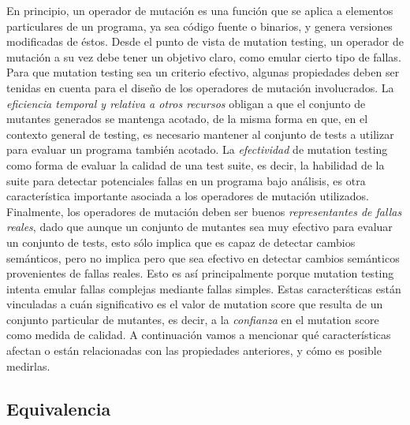 En principio, un operador de mutaci\'on es una funci\'on que se aplica a elementos particulares de un programa, ya sea c\'odigo fuente o binarios, y genera versiones modificadas de \'estos. Desde el punto de vista de mutation testing, un operador de mutaci\'on a su vez debe tener un objetivo claro, como emular cierto tipo de fallas. Para que mutation testing sea un criterio efectivo, algunas propiedades deben ser tenidas en cuenta para el dise\~no de los operadores de mutaci\'on involucrados. La \emph{eficiencia temporal y relativa a otros recursos} obligan a que el conjunto de mutantes generados se mantenga acotado, de la misma forma en que, en el contexto general de testing, es necesario mantener al conjunto de tests a utilizar para evaluar un programa tambi\'en acotado. La \emph{efectividad} de mutation testing como forma de evaluar la calidad de una test suite, es decir, la habilidad de la suite para detectar potenciales fallas en un programa bajo an\'alisis, es otra caracter\'istica importante asociada a los operadores de mutaci\'on utilizados. Finalmente, los operadores de mutaci\'on deben ser buenos \emph{representantes de fallas reales}, dado que aunque un conjunto de mutantes sea muy efectivo para evaluar un conjunto de tests, esto s\'olo implica que es capaz de detectar cambios sem\'anticos, pero no implica pero que sea efectivo en detectar cambios sem\'anticos provenientes de fallas reales. Esto es as\'i principalmente porque mutation testing intenta emular fallas complejas mediante fallas simples. Estas caracter\'sticas est\'an vinculadas a cu\'an significativo es el valor de mutation score que resulta de un conjunto particular de mutantes, es decir, a la \emph{confianza} en el mutation score como medida de calidad. A continuaci\'on vamos a mencionar qu\'e caracter\'isticas afectan o est\'an relacionadas con las propiedades anteriores, y c\'omo es posible medirlas.

\subsection{Equivalencia}

